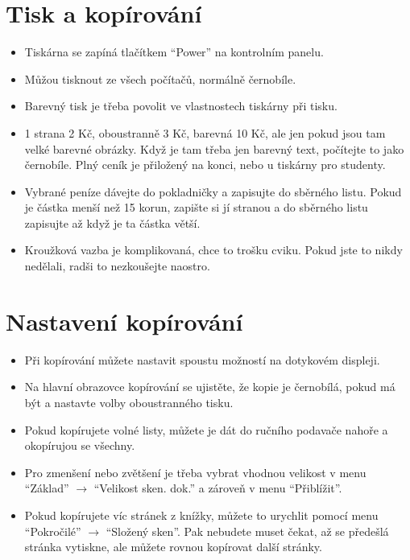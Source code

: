 \documentclass{article}
\begin{document}
\section{Tisk a kopírování}
\begin{itemize}
\item Tiskárna se zapíná tlačítkem \enquote{Power} na kontrolním panelu.
\item Můžou tisknout ze všech počítačů, normálně černobíle.
\item Barevný tisk je třeba povolit ve vlastnostech tiskárny při tisku.
\item 1 strana 2 Kč, oboustranně 3 Kč, barevná 10 Kč, ale jen pokud jsou tam velké barevné obrázky. Když je tam třeba jen barevný text, počítejte to jako černobíle. Plný ceník je přiložený na konci, nebo u tiskárny pro studenty.
\item Vybrané peníze dávejte do pokladničky a zapisujte do sběrného listu. Pokud je částka menší než 15 korun, zapište si jí stranou a do sběrného listu zapisujte až když je ta částka větší.
\item Kroužková vazba je komplikovaná, chce to trošku cviku. Pokud jste to nikdy nedělali, radši to nezkoušejte naostro.
\end{itemize}
  
\section{Nastavení kopírování}
\begin{itemize}
\item Při kopírování můžete nastavit spoustu možností na dotykovém displeji.
\item Na hlavní obrazovce kopírování se ujistěte, že kopie je černobílá, pokud má být a nastavte volby oboustranného tisku. 
\item Pokud kopírujete volné listy, můžete je dát do ručního podavače nahoře a okopírujou se všechny. 
\item Pro zmenšení nebo zvětšení je třeba vybrat vhodnou velikost v menu \enquote{Základ} $\rightarrow$ \enquote{Velikost sken. dok.} a zároveň v menu \enquote{Přiblížit}.
\item Pokud kopírujete víc stránek z knížky, můžete to urychlit pomocí menu \enquote{Pokročilé} $\rightarrow$ \enquote{Složený sken}. Pak nebudete muset čekat, až se předešlá stránka vytiskne, ale můžete rovnou kopírovat další stránky. 
\end{itemize}
\end{document}
